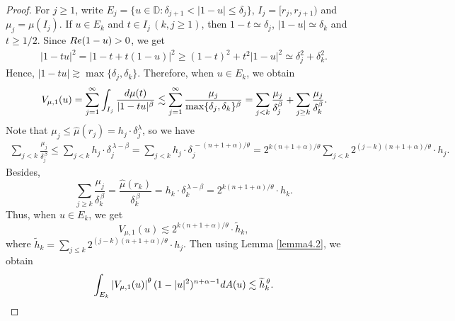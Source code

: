 \documentclass[10pt,a4paper]{amsart}
\begin{document}
\begin{proof}
For $j\geq 1$, write $E_j=\{u\in\mathbb{D}: \delta_{j+1}<|1-u|\leq \delta_j\}$, $I_j=[r_j,r_{j+1})$ and $\mu_{j}=\mu(I_j)$. If $u\in E_k$ and $t\in I_j\, (k,j\geq 1)$, then $1-t\simeq \delta_j$, $|1-u|\simeq \delta_k$ and $t\geq 1/2$. Since ${\rm Re}(1-u)>0$, we get
\begin{align}\label{equa4.4}
|1-tu|^2=\left|1-t+t(1-u)\right|^2\geq (1-t)^2+t^2|1-u|^2\simeq \delta_j^2+\delta_k^2.
\end{align}
Hence, $|1-tu|\gtrsim \max\{\delta_j,\delta_k\}$. Therefore, when $u\in E_k$, we obtain
\begin{align*}
V_{\mu,1}(u)=\sum_{j=1}^{\infty}\int_{I_j}\frac{{\rm d}\mu(t)}{|1-tu|^{\beta}}\lesssim \sum_{j=1}^{\infty}\frac{\mu_j}{\max\{\delta_j,\delta_k\}^{\beta}}=\sum_{j<k}\frac{\mu_j}{\delta_j^{\beta}}+\sum_{j\geq k}\frac{\mu_j}{\delta_k^{\beta}}.
\end{align*}
Note that $\mu_j\leq \hat{\mu}(r_j)=h_j\cdot \delta_j^{\lambda}$, so we have
\begin{equation*}
\begin{split}
\sum_{j<k}\frac{\mu_j}{\delta_j^{\,\beta}}\leq \sum_{j<k}h_j\cdot \delta_j^{\,\lambda-\beta}=\sum_{j<k}h_j\cdot \delta_j^{\,-(n+1+\alpha)/\theta}=2^{k(n+1+\alpha)/\theta} \sum_{j<k}2^{(j-k)(n+1+\alpha)/\theta}\cdot h_j.
\end{split}
\end{equation*}
Besides,
\begin{equation*}
\sum_{j\geq k}\frac{\mu_j}{\delta_k^{\,\beta}}=\frac{\hat{\mu}(r_k)}{\delta_k^{\,\beta}}=h_k\cdot\delta_k^{\,\lambda-\beta}=2^{k(n+1+\alpha)/\theta}\cdot h_k.
\end{equation*}
Thus, when $u\in E_k$, we get
\begin{equation*}
V_{\mu,1}(u)\lesssim 2^{k(n+1+\alpha)/\theta}\cdot \widetilde{h}_k,
\end{equation*}
where $\widetilde{h}_k=\sum_{j\leq k}2^{(j-k)(n+1+\alpha)/\theta}\cdot h_j$. Then using Lemma \ref{lemma4.2}, we obtain
\begin{align*}
\int_{E_k}\left|V_{\mu,1}(u)\right|^{\theta}(1-|u|^2)^{n+\alpha-1}{\rm d}A(u)\lesssim \widetilde{h}_k^{\,\theta}.
\end{align*}


\end{proof}
\end{document}
